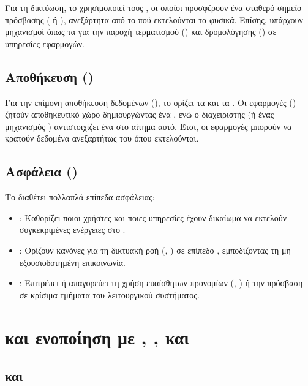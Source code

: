 Για τη δικτύωση, το  χρησιμοποιεί τους , οι οποίοι προσφέρουν ένα σταθερό σημείο πρόσβασης ( ή ), ανεξάρτητα από το πού εκτελούνται τα  φυσικά. Επίσης, υπάρχουν μηχανισμοί όπως τα  για την παροχή  τερματισμού () και δρομολόγησης () σε υπηρεσίες εφαρμογών.

\subsection{Αποθήκευση ()}

Για την επίμονη αποθήκευση δεδομένων (), το  ορίζει τα  και τα . Οι εφαρμογές () ζητούν αποθηκευτικό χώρο δημιουργώντας ένα , ενώ ο διαχειριστής (ή ένας μηχανισμός ) αντιστοιχίζει ένα  στο αίτημα αυτό. Έτσι, οι εφαρμογές μπορούν να κρατούν δεδομένα ανεξαρτήτως του  όπου εκτελούνται.

\subsection{Ασφάλεια ()}

Το  διαθέτει πολλαπλά επίπεδα ασφάλειας:
\begin{itemize}
    \item \textbf{}: Καθορίζει ποιοι χρήστες και ποιες υπηρεσίες έχουν δικαίωμα να εκτελούν συγκεκριμένες ενέργειες στο .
    \item \textbf{}: Ορίζουν κανόνες για τη δικτυακή ροή (, ) σε επίπεδο , εμποδίζοντας τη μη εξουσιοδοτημένη επικοινωνία.
    \item \textbf{}: Επιτρέπει ή απαγορεύει τη χρήση ευαίσθητων προνομίων (, ) ή την πρόσβαση σε κρίσιμα τμήματα του λειτουργικού συστήματος.
\end{itemize}

\section{ και ενοποίηση με , ,  και }

\subsection{ και }


